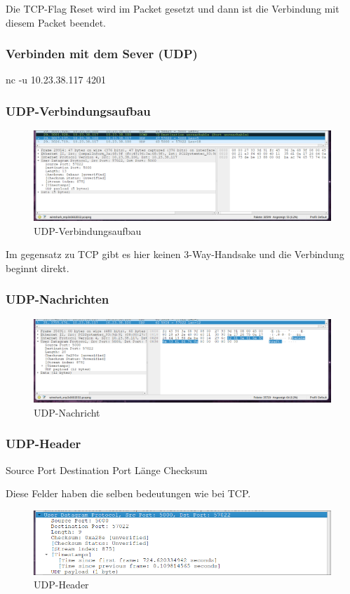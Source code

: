 \documentclass[a4paper]{article}
\begin{document}
Die TCP-Flag Reset wird im Packet gesetzt und dann ist die Verbindung mit diesem Packet beendet.
\subsubsection{Verbinden mit dem Sever (UDP)}
nc -u 10.23.38.117 4201
\subsubsection{UDP-Verbindungsaufbau}
\begin{figure}[h]
	\includegraphics[scale=0.3]{images/udpverbindungsaufbau.png}
	\caption{UDP-Verbindungsaufbau}
\end{figure}

Im gegensatz zu TCP gibt es hier keinen 3-Way-Handsake und die Verbindung beginnt direkt.
\subsubsection{UDP-Nachrichten}
\begin{figure}[h]
	\includegraphics[scale=0.3]{images/udp-nachricht.png}
	\caption{UDP-Nachricht}
\end{figure}
\subsubsection {UDP-Header}
\begin{outline}
	\1 Source Port
	\1 Destination Port
	\1 Länge
	\1 Checksum
\end{outline}
Diese Felder haben die selben bedeutungen wie bei TCP. \cite{UDP}
\\
\begin{figure}[h]
	\includegraphics[scale=0.45]{images/UDP-Header.png}
	\caption{UDP-Header}
\end{figure}
\end{document}
